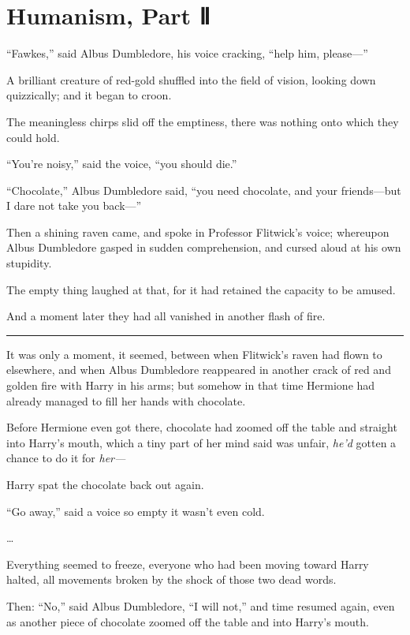 \chapter{Humanism, Part Ⅱ}

``Fawkes,'' said Albus Dumbledore, his voice cracking, ``help him,
please---''

A brilliant creature of red-gold shuffled into the field of vision,
looking down quizzically; and it began to croon.

The meaningless chirps slid off the emptiness, there was nothing onto
which they could hold.

``You're noisy,'' said the voice, ``you should die.''

``Chocolate,'' Albus Dumbledore said, ``you need chocolate, and your
friends---but I dare not take you back---''

Then a shining raven came, and spoke in Professor Flitwick's voice;
whereupon Albus Dumbledore gasped in sudden comprehension, and cursed
aloud at his own stupidity.

The empty thing laughed at that, for it had retained the capacity to be
amused.

And a moment later they had all vanished in another flash of fire.

\begin{center}\rule{3in}{0.4pt}\end{center}

It was only a moment, it seemed, between when Flitwick's raven had flown
to elsewhere, and when Albus Dumbledore reappeared in another crack of
red and golden fire with Harry in his arms; but somehow in that time
Hermione had already managed to fill her hands with chocolate.

Before Hermione even got there, chocolate had zoomed off the table and
straight into Harry's mouth, which a tiny part of her mind said was
unfair, \emph{he'd} gotten a chance to do it for \emph{her---}

Harry spat the chocolate back out again.

``Go away,'' said a voice so empty it wasn't even cold.

\ldots{}

Everything seemed to freeze, everyone who had been moving toward Harry
halted, all movements broken by the shock of those two dead words.

Then: ``No,'' said Albus Dumbledore, ``I will not,'' and time resumed
again, even as another piece of chocolate zoomed off the table and into
Harry's mouth.

